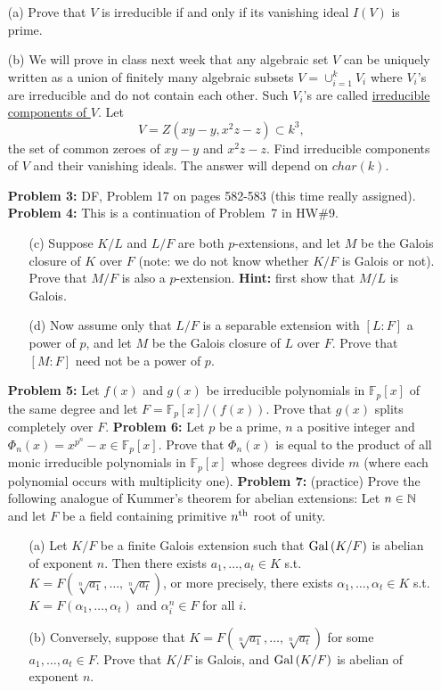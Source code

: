 \documentclass[12pt]{article}
\begin{document}
\begin{itemize}
\item[(a)] Prove that $V$ is irreducible if and only if its vanishing ideal
$I(V)$ is prime.
\item[(b)] We will prove in class next week that any algebraic set $V$
can be uniquely written as a union of finitely many algebraic subsets 
$V=\cup_{i=1}^k V_i$ where $V_i$'s are irreducible and do not contain
each other. Such $V_i$'s are called \underline{irreducible components of $V$}.
Let $$V=Z(xy-y, x^2z-z)\subset k^3,$$ the set of common zeroes of $xy-y$
and $x^2z-z$. Find irreducible components of $V$ and their vanishing ideals.
The answer will depend on $char(k)$.
\skv


{\bf Problem 3:} DF, Problem 17 on pages 582-583 (this time really assigned).
\skv
{\bf Problem 4:} This is a continuation of Problem~7 in HW\#9.
\begin{itemize}
\item[(c)] Suppose $K/L$ and $L/F$ are both $p$-extensions, and
let $M$ be the Galois closure of $K$ over $F$ (note: we do
not know whether $K/F$ is Galois or not). Prove that
$M/F$ is also a $p$-extension. {\bf Hint:} first show that
$M/L$ is Galois.

\item[(d)] Now assume only that $L/F$ is a separable extension
with $[L:F]$ a power of $p$, and let $M$ be the Galois closure
of $L$ over $F$. Prove that $[M:F]$ need not be a power of $p$.
\end{itemize}

\skv
{\bf Problem 5:} Let $f(x)$ and $g(x)$ be irreducible polynomials in $\mathbb F_p[x]$
of the same degree and let $F=\mathbb F_p[x]/(f(x))$. Prove that $g(x)$ splits completely over $F$.
\skv
{\bf Problem 6:} Let $p$ be a prime, $n$ a positive integer and
$\Phi_n(x)=x^{p^n}-x\in \mathbb F_p[x]$. Prove that $\Phi_n(x)$ is equal to the product
of all monic irreducible polynomials in $\mathbb F_p[x]$ whose degrees divide $m$
(where each polynomial occurs with multiplicity one).
\skv
\skv
{\bf Problem 7:} (practice) Prove the following analogue of Kummer's theorem for abelian extensions:
Let $n\in{\mathbb N}$ and let $F$ be a field containing primitive $n^{\rm th}$ root of unity.
\begin{itemize}
\item[(a)] Let $K/F$ be a finite Galois extension such that ${\rm Gal\,}(K/F)$ is abelian
of exponent $n$. Then there exists $a_1,\ldots, a_t\in K$ s.t.
$K=F(\sqrt[n]{a_1},\ldots,\sqrt[n]{a_t})$, or more precisely, there exists
$\alpha_1,\ldots, \alpha_t\in K$ s.t.
$K=F(\alpha_1,\ldots,\alpha_t)$ and $\alpha_i^n\in F$ for all $i$.

\item[(b)] Conversely, suppose that $K=F(\sqrt[n]{a_1},\ldots,\sqrt[n]{a_t})$
for some $a_1,\ldots, a_t\in F$. Prove that $K/F$ is Galois, and ${\rm Gal\,}(K/F)$
is abelian of exponent $n$.
\end{itemize}


\end{itemize}
\end{document}
